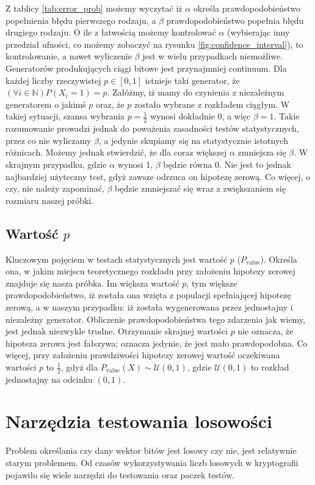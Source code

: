 Z tablicy \ref{tab:error_prob} możemy wyczytać iż $\alpha$ określa prawdopodobieństwo popełnienia błędu pierwszego rodzaju, a $\beta$ prawdopodobieństwo popełnia błędu drugiego rodzaju. O ile z łatwością możemy kontrolować $\alpha$ (wybierając inny przedział ufności, co możemy zobaczyć na rysunku \ref{fig:confidence_interval}), to kontrolowanie, a nawet wyliczenie $\beta$ jest w wielu przypadkach niemożliwe. 
Generatorów produkujących ciągi bitowe jest przynajmniej continuum. Dla każdej liczby rzeczywistej $p \in [0, 1]$ istnieje taki generator, że $(\forall i\in \mathbb{N})P(X_i=1) = p$. Załóżmy, iż mamy do czynienia z niezależnym generatorem o jakimś $p$ oraz, że $p$ zostało wybrane z rozkładem ciągłym. W takiej sytuacji, szansa wybrania $p = \frac{1}{2}$ wynosi dokładnie 0, a więc $\beta = 1$. Takie rozumowanie prowadzi jednak do poważenia zasadności testów statystycznych, przez co nie wyliczamy $\beta$, a jedynie skupiamy się na statystycznie istotnych różnicach.  
Możemy jednak stwierdzić, że dla coraz większej $\alpha$ zmniejsza się $\beta$. W skrajnym przypadku, gdzie $\alpha$ wynosi 1, $\beta$ będzie równa 0. Nie jest to jednak najbardziej użyteczny test, gdyż zawsze odrzuca on hipotezę zerową. Co więcej, o czy, nie należy zapominać, $\beta$ będzie zmniejszać się wraz z zwiększaniem się rozmiaru naszej próbki.
\subsection{Wartość $p$}
Kluczowym pojęciem w testach statystycznych jest wartość $p$ ($P_{\textrm{value}}$). Określa ona, w jakim miejscu teoretycznego rozkładu przy założeniu hipotezy zerowej znajduje się nasza próbka. Im większa wartość $p$, tym większe prawdopodobieństwo, iż została ona wzięta z populacji spełniającej hipotezę zerową, a w naszym przypadku: iż została wygenerowana przez jednostajny i niezależny generator. Obliczenie prawdopodobieństwa tego zdarzenia jak wiemy, jest jednak niezwykle trudne. Otrzymanie skrajnej wartości $p$ nie oznacza, że hipoteza zerowa jest fałszywa; oznacza jedynie, że jest mało prawdopodobna. Co więcej, przy założeniu prawdziwości hipotezy zerowej wartość oczekiwana wartości $p$ to $\frac{1}{2}$, gdyż dla $P_{\textrm{value}}(X) \sim \mathcal{U}(0, 1)$, gdzie $\mathcal{U}(0, 1)$ to rozkład jednostajny na odcinku $(0, 1)$. 
\section{Narzędzia testowania losowości}
Problem określania czy dany wektor bitów jest losowy czy nie, jest relatywnie starym problemem. Od czasów wykorzystywania liczb losowych w kryptografii pojawiło się wiele narzędzi do testowania oraz paczek testów.
